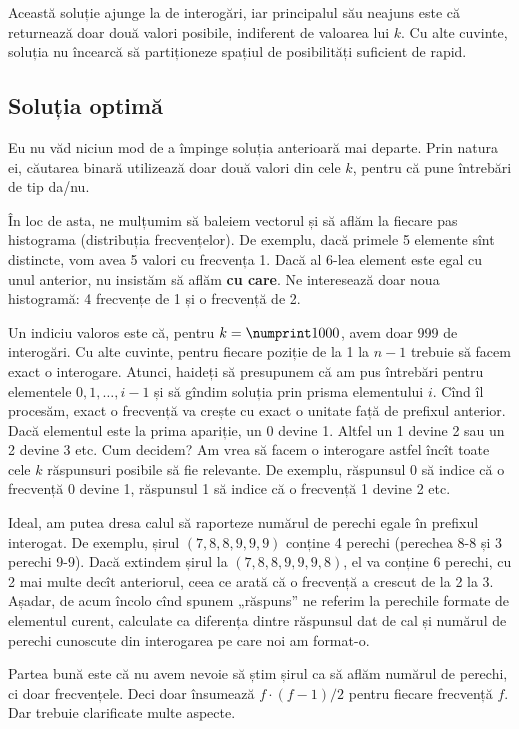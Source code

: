 \documentclass[../main.tex]{subfiles}
\begin{document}
Această soluție ajunge la  de interogări, iar principalul său neajuns este că  returnează doar două valori posibile, indiferent de valoarea lui $k$. Cu alte cuvinte, soluția nu încearcă să partiționeze spațiul de posibilități suficient de rapid.

\subsection{Soluția optimă}

Eu nu văd niciun mod de a împinge soluția anterioară mai departe. Prin natura ei, căutarea binară utilizează doar două valori din cele $k$, pentru că pune întrebări de tip da/nu.

În loc de asta, ne mulțumim să baleiem vectorul și să aflăm la fiecare pas histograma (distribuția frecvențelor). De exemplu, dacă primele 5 elemente sînt distincte, vom avea 5 valori cu frecvența 1. Dacă al 6-lea element este egal cu unul anterior, nu insistăm să aflăm \textbf{cu care}. Ne interesează doar noua histogramă: 4 frecvențe de 1 și o frecvență de 2.

Un indiciu valoros este că, pentru $k = \np{1000}$, avem doar 999 de interogări. Cu alte cuvinte, pentru fiecare poziție de la 1 la $n-1$ trebuie să facem exact o interogare. Atunci, haideți să presupunem că am pus întrebări pentru elementele $0, 1, \dots, i-1$ și să gîndim soluția prin prisma elementului $i$. Cînd îl procesăm, exact o frecvență va crește cu exact o unitate față de prefixul anterior. Dacă elementul este la prima apariție, un 0 devine 1. Altfel un 1 devine 2 sau un 2 devine 3 etc. Cum decidem? Am vrea să facem o interogare astfel încît toate cele $k$ răspunsuri posibile să fie relevante. De exemplu, răspunsul 0 să indice că o frecvență 0 devine 1, răspunsul 1 să indice că o frecvență 1 devine 2 etc.

Ideal, am putea dresa calul să raporteze numărul de perechi egale în prefixul interogat. De exemplu, șirul $(7, 8, 8, 9, 9, 9)$ conține 4 perechi (perechea 8-8 și 3 perechi 9-9). Dacă extindem șirul la $(7, 8, 8, 9, 9, 9, 8)$, el va conține 6 perechi, cu 2 mai multe decît anteriorul, ceea ce arată că o frecvență a crescut de la 2 la 3. Așadar, de acum încolo cînd spunem „răspuns” ne referim la perechile formate de elementul curent, calculate ca diferența dintre răspunsul dat de cal și numărul de perechi cunoscute din interogarea pe care noi am format-o.

Partea bună este că nu avem nevoie să știm șirul ca să aflăm numărul de perechi, ci doar frecvențele. Deci  doar însumează $f \cdot (f-1)/2$ pentru fiecare frecvență $f$. Dar trebuie clarificate multe aspecte.
\end{document}
